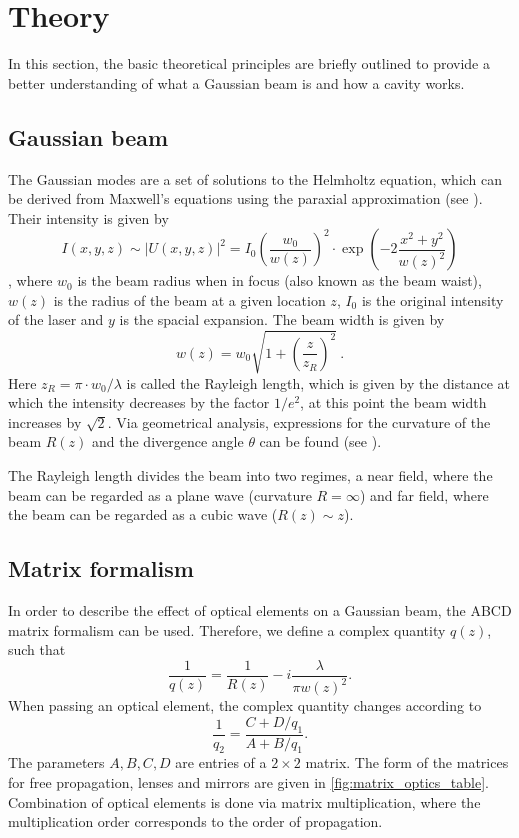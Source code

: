 \section{Theory}
\label{sec:theorie}

In this section, the basic theoretical principles are briefly outlined to provide a better understanding of what a Gaussian beam is and how a cavity works.

\subsection{Gaussian beam}
The Gaussian modes are a set of solutions to the Helmholtz equation, which can be derived from Maxwell's equations using the paraxial approximation (see \autocite{gaussian_beam_script}). Their intensity is given by 
$$ I(x,y,z) \sim |U(x,y,z)|^2=I_0\left(\frac{w_0}{w(z)}\right)^2 \cdot \exp\left(-2\frac{x^2+y^2}{w(z)^2}\right)$$
, where $w_0$ is the beam radius when in focus (also known as the beam waist), $w(z)$ is the radius of the beam at a given location $z$, $I_0$ is the original intensity of the laser and $y$ is the spacial expansion. The beam width is given by
\begin{equation}\label{eqn:wz}
	w(z)=w_0\sqrt{1+\left(\frac{z}{z_R}\right)^2}\ .
\end{equation}
Here $z_R = \pi\cdot w_0/\lambda$ is called the Rayleigh length, which is given by the distance at which the intensity decreases by the factor $1/e^2$, at this point the beam width increases by $\sqrt{2}$. Via geometrical analysis, expressions for the curvature of the beam $R(z)$ and the divergence angle $\theta$ can be found (see \autocite{gaussian_beam_script}).

The Rayleigh length divides the beam into two regimes, a near field, where the beam can be regarded as a plane wave (curvature $R=\infty$) and far field, where the beam can be regarded as a cubic wave ($R(z)\sim z$). 

\subsection{Matrix formalism}\label{subsec:matrix}
In order to describe the effect of optical elements on a Gaussian beam, the ABCD matrix formalism can be used. Therefore, we define a complex quantity $q(z)$, such that
$$\frac{1}{q(z)} = \frac{1}{R(z)}- i\frac{\lambda}{\pi w(z)^2}.$$
When passing an optical element, the complex quantity changes according to
$$\frac{1}{q_2}=\frac{C+D/q_1}{A+B/q_1}.$$
The parameters $A,B,C,D$ are entries of a $2 \times 2$ matrix. The form of the matrices for free propagation, lenses and mirrors are given in \autoref{fig:matrix_optics_table}. Combination of optical elements is done via matrix multiplication, where the multiplication order corresponds to the order of propagation.

